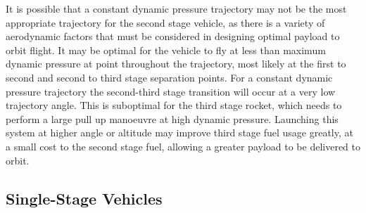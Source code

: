 It is possible that a constant dynamic pressure trajectory may not be the most appropriate trajectory for the second stage vehicle, as there is a variety of aerodynamic factors that must be considered in designing optimal payload to orbit flight. It may be optimal for the vehicle to fly at less than maximum dynamic pressure at point throughout the trajectory, most likely at the first to second and second to third stage separation points. For a constant dynamic pressure trajectory the second-third stage transition will occur at a very low trajectory angle. This is suboptimal for the third stage rocket, which needs to perform a large pull up manoeuvre at high dynamic pressure. Launching this system at higher angle or altitude may improve third stage fuel usage greatly, at a small cost to the second stage fuel, allowing a greater payload to be delivered to orbit. 

\subsection{Single-Stage Vehicles}

